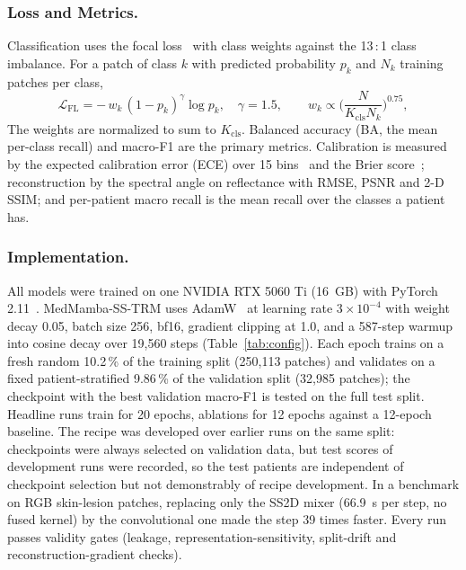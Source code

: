 \documentclass{svproc}
\begin{document}
\subsubsection{Loss and Metrics.}
Classification uses the focal loss~\cite{focal} with class weights against the 13\,:\,1 class imbalance. For a patch of class $k$ with predicted probability $p_k$ and $N_k$ training patches per class,
\begin{equation}
\mathcal{L}_{\text{FL}} = -\,w_k\,(1 - p_k)^{\gamma} \log p_k, \quad \gamma = 1.5, \qquad
w_k \propto \Big(\frac{N}{K_{\text{cls}} N_k}\Big)^{0.75},
\label{eq:focal}
\end{equation}
The weights are normalized to sum to $K_{\text{cls}}$. Balanced accuracy (BA, the mean per-class recall) and macro-F1 are the primary metrics. Calibration is measured by the expected calibration error (ECE) over 15 bins~\cite{naeini,guo2017} and the Brier score~\cite{brier}; reconstruction by the spectral angle on reflectance with RMSE, PSNR and 2-D SSIM; and per-patient macro recall is the mean recall over the classes a patient has.

\subsubsection{Implementation.}
All models were trained on one NVIDIA RTX 5060 Ti (16~GB) with PyTorch 2.11~\cite{pytorch}. MedMamba-SS-TRM uses AdamW~\cite{adamw} at learning rate $3 \times 10^{-4}$ with weight decay 0.05, batch size 256, bf16, gradient clipping at 1.0, and a 587-step warmup into cosine decay over 19,560 steps (Table~\ref{tab:config}). Each epoch trains on a fresh random 10.2\,\% of the training split (250,113 patches) and validates on a fixed patient-stratified 9.86\,\% of the validation split (32,985 patches); the checkpoint with the best validation macro-F1 is tested on the full test split. Headline runs train for 20 epochs, ablations for 12 epochs against a 12-epoch baseline. The recipe was developed over earlier runs on the same split: checkpoints were always selected on validation data, but test scores of development runs were recorded, so the test patients are independent of checkpoint selection but not demonstrably of recipe development. In a benchmark on RGB skin-lesion patches, replacing only the SS2D mixer (66.9~s per step, no fused kernel) by the convolutional one made the step 39 times faster. Every run passes validity gates (leakage, representation-sensitivity, split-drift and reconstruction-gradient checks).
\end{document}
